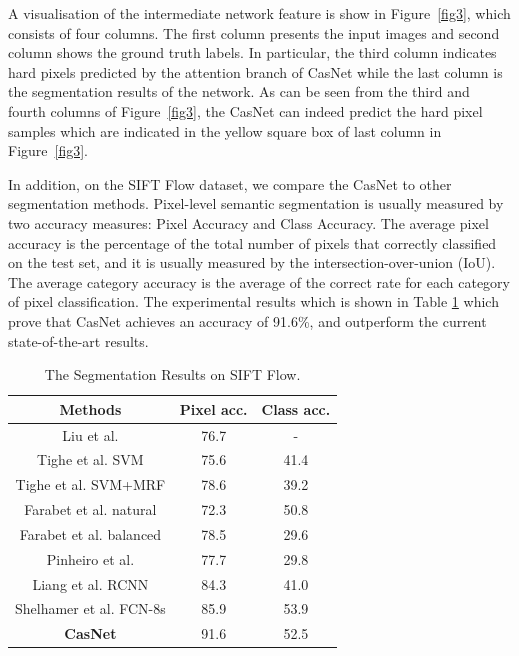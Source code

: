 \documentclass[10.5pt,compsoc]{TsT}
\newcommand{\upcite}[1]{\superscript{\textsuperscript{\cite{#1}}}}
\theoremstyle{mystyle}
\newcommand{\upcite}[1]{\textsuperscript{\cite{#1}}}
\begin{document}
{A visualisation of the intermediate network feature is show in Figure~\ref{fig3}, which consists of four columns. The first column presents the input images and second column shows the ground truth labels. In particular, the third column indicates hard pixels predicted by the attention branch of CasNet while the last column is the segmentation results of the network. As can be seen from the third and fourth columns of Figure~\ref{fig3}, the CasNet can indeed predict the hard pixel samples which are indicated in the yellow square box of last column in Figure~\ref{fig3}.

In addition, on the SIFT Flow dataset, we compare the CasNet to other segmentation methods. Pixel-level semantic segmentation is usually measured by two accuracy measures: Pixel Accuracy and Class Accuracy. The average pixel accuracy is the percentage of the total number of pixels that correctly classified on the test set, and it is usually measured by the intersection-over-union (IoU). The average category accuracy is the average of the correct rate for each category of pixel classification. The experimental results which is shown in Table \ref{table1} which prove that CasNet achieves an accuracy of 91.6\%, and outperform the current state-of-the-art results.

\begin{table}[h]
\large
\setlength{\belowcaptionskip}{12pt}
\caption{The Segmentation Results on SIFT Flow.}
\label{table1}
\centering
\begin{tabular}{ccc}
\hline 
Methods & Pixel acc. & Class acc. \\
\hline
Liu et al.\upcite{6} & 76.7 & - \\
Tighe et al. SVM\upcite{25} & 75.6 & 41.4 \\
Tighe et al. SVM+MRF\upcite{26} & 78.6 & 39.2 \\
Farabet et al. natural\upcite{11} & 72.3 & 50.8 \\
Farabet et al. balanced\upcite{11} & 78.5 & 29.6 \\
Pinheiro et al.\upcite{13} & 77.7 & 29.8 \\
Liang et al. RCNN\upcite{24} & 84.3 & 41.0 \\
Shelhamer et al. FCN-8s\upcite{4} & 85.9 & 53.9 \\
\textbf{CasNet} & 91.6 & 52.5 \\

\hline
\end{tabular}
\end{table}

}
\end{document}
